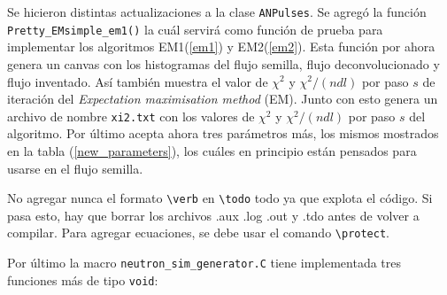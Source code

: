 \documentclass[11pt,letterpaper]{article}
\begin{document}
Se hicieron distintas actualizaciones a la clase \verb|ANPulses|. Se agregó la función  \verb|Pretty_EMsimple_em1()| la cuál servirá como función de prueba para implementar los algoritmos EM1(\ref{em1}) y EM2(\ref{em2}).  Esta función por ahora genera un canvas con los histogramas del flujo semilla,  flujo deconvolucionado y flujo inventado. Así también muestra el valor de $\chi^2$ y $\chi^2/(ndl)$ por paso $s$ de iteración del \textit{Expectation maximisation method} (EM).  Junto con esto genera un archivo de nombre \verb|xi2.txt| con los valores de $\chi^2$ y $\chi^2/(ndl)$ por paso $s$ del algoritmo. Por último acepta ahora tres parámetros más, los mismos mostrados en la tabla (\ref{new_parameters}), los cuáles en principio están pensados para usarse en el flujo semilla.   


\begin{tipt}
No agregar nunca el formato \verb|\verb| en \verb|\todo| todo ya que explota el código. Si pasa esto, hay que borrar los archivos .aux .log .out y .tdo antes de volver a compilar. Para agregar ecuaciones, se debe usar el comando \verb|\protect|.
\end{tipt}

Por último la macro \verb|neutron_sim_generator.C| tiene implementada tres funciones más de tipo \verb|void|: 
\end{document}
